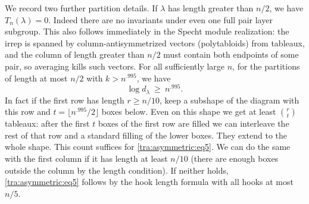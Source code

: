 \begin{lemma}\label{tra:asymmetric:dimension}
\label{tra:asymmetric:dimension-and-annihilation}
We record two further partition details. If \(\lambda\) has length greater than \(n/2\), we have \(T_n(\lambda)=0\). Indeed there are no invariants under even one full pair layer subgroup. This also follows immediately in the Specht module realization: the irrep is spanned by column-antisymmetrized vectors (polytabloids) from tableaux, and the column of length greater than \(n/2\) must contain both endpoints of some pair, so averaging kills such vectors. For all sufficiently large \(n\), for the partitions of length at most \(n/2\) with \(k>n^{.995}\), we have
\begin{equation}
                            \log d_\lambda\ \ge\ n^{.995}.
                      \label{tra:asymmetric:eq5}
\end{equation}
In fact if the first row has length \(r\ge n/10\), keep a subshape of the diagram with this row and \(t=\lfloor n^{.995}/2\rfloor\) boxes below. Even on this shape we get at least \(\binom rt\) tableaux: after the first \(t\) boxes of the first row are filled we can interleave the rest of that row and a standard filling of the lower boxes. They extend to the whole shape. This count suffices for \eqref{tra:asymmetric:eq5}. We can do the same with the first column if it has length at least \(n/10\) (there are enough boxes outside the column by the length condition). If neither holds, \eqref{tra:asymmetric:eq5} follows by the hook length formula with all hooks at most \(n/5\).
\end{lemma}
